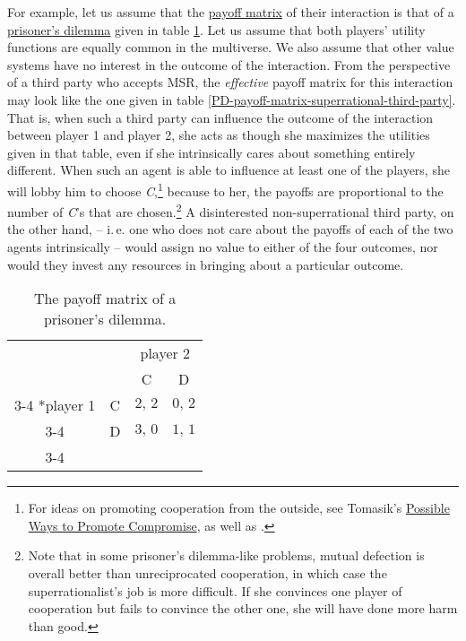 For example, let us assume that the
\href{https://en.wikipedia.org/wiki/Normal-form_game}{payoff
matrix} of their interaction is that of a
\href{https://en.wikipedia.org/wiki/Prisoner\%27s_dilemma}{prisoner's
dilemma} given in table \ref{PD-payoff-matrix}. Let us
assume that both players' utility functions are equally common in the
multiverse. We also assume that other value systems have no interest in
the outcome of the interaction. From the perspective of a third party
who accepts MSR, the \emph{effective} payoff matrix for this interaction
may look like the one given in table
\ref{PD-payoff-matrix-superrational-third-party}. That
is, when such a third party can influence the outcome of the interaction
between player 1 and player 2, she acts as though she maximizes the
utilities given in that table, even if she intrinsically cares about
something entirely different. When such an agent is able to influence at
least one of the players, she will lobby him to choose
\emph{C},\footnote{For ideas on promoting cooperation from the outside,
  see Tomasik's
  \href{https://foundational-research.org/possible-ways-to-promote-compromise/}{Possible
  Ways to Promote Compromise}, as well as \cite[chapter 7]{Axelrod2006-ci}.} because to her, the payoffs
are proportional to the number of \emph{C}'s that are chosen.\footnote{Note
  that in some prisoner's dilemma-like problems, mutual defection is
  overall better than unreciprocated cooperation, in which case the
  superrationalist's job is more difficult. If she convinces one player
  of cooperation but fails to convince the other one, she will have done
  more harm than good.} A disinterested non-superrational third party,
on the other hand, -- i.\,e. one who does not care about the payoffs of
each of the two agents intrinsically -- would assign no value to either
of the four outcomes, nor would they invest any resources in bringing
about a particular outcome.

\renewcommand{\arraystretch}{1.5}
\begin{table}[h!]
    \centering
    \setlength{\extrarowheight}{2pt}
    \begin{tabular}{cc|c|c|}
      & \multicolumn{1}{c}{} & \multicolumn{2}{c}{player 2}\\
      & \multicolumn{1}{c}{} & \multicolumn{1}{c}{C}  & \multicolumn{1}{c}{D} \\\cline{3-4}
      \multirow{2}*{player 1}  & C & $2,\, 2$ & $0,\, 2$ \\\cline{3-4}
      & D & $3,\, 0$ & $1,\, 1$ \\\cline{3-4}
    \end{tabular}
    \caption{The payoff matrix of a prisoner's dilemma.}
    \label{PD-payoff-matrix}
\end{table}


